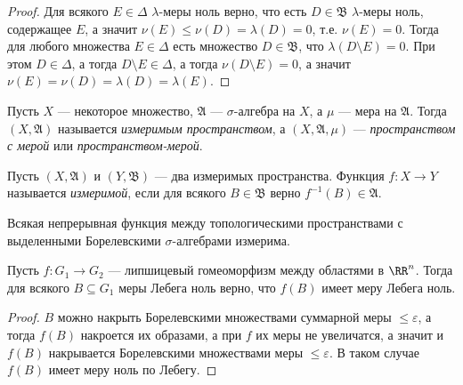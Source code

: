 \documentclass[12pt,a4paper]{article}
\begin{document}
    \begin{proof}
        Для всякого $E \in \Delta$ $\lambda$-меры ноль верно, что есть $D \in \mathfrak{B}$ $\lambda$-меры ноль, содержащее $E$, а значит $\nu(E) \leqslant \nu(D) = \lambda(D) = 0$, т.е. $\nu(E) = 0$. Тогда для любого множества $E \in \Delta$ есть множество $D \in \mathfrak{B}$, что $\lambda(D \setminus E) = 0$. При этом $D \in \Delta$, а тогда $D \setminus E \in \Delta$, а тогда $\nu(D \setminus E) = 0$, а значит $\nu(E) = \nu(D) = \lambda(D) = \lambda(E)$.
    \end{proof}

    \begin{definition}
        Пусть $X$ --- некоторое множество, $\mathfrak{A}$ --- $\sigma$-алгебра на $X$, а $\mu$ --- мера на $\mathfrak{A}$. Тогда $(X, \mathfrak{A})$ называется \emph{измеримым пространством}, а $(X, \mathfrak{A}, \mu)$ --- \emph{пространством с мерой} или \emph{пространством-мерой}.
    \end{definition}

    \begin{definition}
        Пусть $(X, \mathfrak{A})$ и $(Y, \mathfrak{B})$ --- два измеримых пространства. Функция $f: X \to Y$ называется \emph{измеримой}, если для всякого $B \in \mathfrak{B}$ верно $f^{-1}(B) \in \mathfrak{A}$.
    \end{definition}

    \begin{example}
        Всякая непрерывная функция между топологическими пространствами с выделенными Борелевскими $\sigma$-алгебрами измерима.
    \end{example}

    \begin{lemma}
        Пусть $f: G_1 \to G_2$ --- липшицевый гомеоморфизм между областями в $\RR^n$. Тогда для всякого $B \subseteq G_1$ меры Лебега ноль верно, что $f(B)$ имеет меру Лебега ноль.
    \end{lemma}

    \begin{proof}
        $B$ можно накрыть Борелевскими множествами суммарной меры $\leqslant \varepsilon$, а тогда $f(B)$ накроется их образами, а при $f$ их меры не увеличатся, а значит и $f(B)$ накрывается Борелевскими множествами меры $\leqslant \varepsilon$. В таком случае $f(B)$ имеет меру ноль по Лебегу.
    \end{proof}



\end{document}
